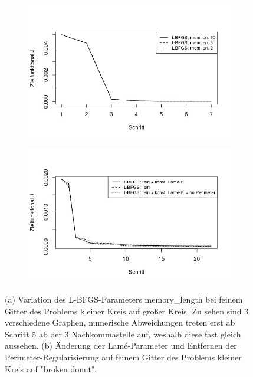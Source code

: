 \begin{figure}
	\begin{subfigure}{0.5\textwidth}
	\centering
	\includegraphics[scale=0.48]{plot_circle_bfgs_fine_memlen.jpeg}
	\caption{}	
	\end{subfigure}
	\begin{subfigure}{0.5\textwidth}
	\centering
	\includegraphics[scale=0.48]{plot_donut_bfgs_fine_lame.jpeg}
	\caption{}	
	\end{subfigure}
\caption{(a) Variation des L-BFGS-Parameters \textsf{memory\_length} bei feinem Gitter des Problems kleiner Kreis auf großer Kreis. Zu sehen sind 3 verschiedene Graphen, numerische Abweichungen treten erst ab Schritt 5 ab der 3 Nachkommastelle auf, weshalb diese fast gleich aussehen. \newline (b) Änderung der Lamé-Parameter und Entfernen der Perimeter-Regularisierung auf feinem Gitter des Problems kleiner Kreis auf "broken  donut".}
\label{plot_memlen_lame}
\end{figure}

